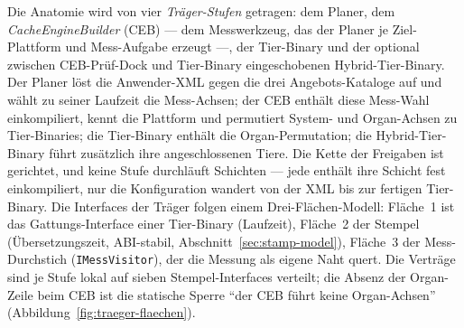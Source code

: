 \begin{nurkurz}
Die Anatomie wird von vier \emph{Träger-Stufen} getragen: dem Planer, dem \emph{CacheEngineBuilder} (CEB) ---
dem Messwerkzeug, das der Planer je Ziel-Plattform und Mess-Aufgabe erzeugt ---, der Tier-Binary und der
optional zwischen CEB-Prüf-Dock und Tier-Binary eingeschobenen Hybrid-Tier-Binary. Der Planer löst die
Anwender-XML gegen die drei Angebots-Kataloge auf und wählt zu seiner Laufzeit die Mess-Achsen; der CEB enthält diese Mess-Wahl einkompiliert, kennt die Plattform und permutiert
System- und Organ-Achsen zu Tier-Binaries; die Tier-Binary enthält die Organ-Permutation; die
Hybrid-Tier-Binary führt zusätzlich ihre angeschlossenen Tiere. Die Kette der Freigaben ist gerichtet, und
keine Stufe durchläuft Schichten --- jede enthält ihre Schicht fest einkompiliert, nur die Konfiguration
wandert von der XML bis zur fertigen Tier-Binary. Die Interfaces der Träger folgen einem Drei-Flächen-Modell:
Fläche~1 ist das Gattungs-Interface einer Tier-Binary (Laufzeit), Fläche~2 der Stempel (Übersetzungszeit,
ABI-stabil, Abschnitt~\ref{sec:stamp-model}), Fläche~3 der Mess-Durchstich (\texttt{IMessVisitor}), der die
Messung als eigene Naht quert. Die Verträge sind je Stufe lokal auf sieben Stempel-Interfaces verteilt; die
Absenz der Organ-Zeile beim CEB ist die statische Sperre \enquote{der CEB führt keine Organ-Achsen}
(Abbildung~\ref{fig:traeger-flaechen}).
\begin{figure}[htbp]\centering
{}
\end{figure}
\end{nurkurz}
